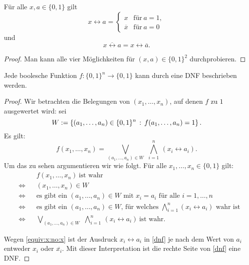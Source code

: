 \begin{lem}
	Für alle $x, a \in \{0,1\}$ gilt
	\begin{equation} \label{equiv:x:no:x}
	x \leftrightarrow a = \begin{cases} 
		x & \text{für} \ a=1,
		\\				\overline{x} & \text{für} \ a=0
	\end{cases} 
	\end{equation}
	und 
	\begin{equation} \label{neg:equiv} 
		\overline{x \leftrightarrow a} = x \leftrightarrow \overline{a}. 
	\end{equation}
\end{lem} 
\begin{proof} 
	Man kann alle vier Möglichkeiten für $(x,a) \in \{0,1\}^2$ durchprobieren. 
\end{proof} 

\begin{thm}
	Jede boolesche Funktion $ f: \{0,1\}^n \to \{0,1\}$ kann durch eine DNF beschrieben werden. 
\end{thm} 
\begin{proof}
	Wir betrachten die Belegungen von $(x_1,\ldots,x_n)$, auf denen $f$ zu $1$ ausgewertet wird: 
	sei 
	\[
	W := \left\{  (a_1,\ldots,a_n) \in \{0,1\}^n \,:\, f(a_1,\ldots,a_n) = 1 \right\}. 
	\]
	Es gilt:
	\begin{equation}
		\label{dnf}
		f(x_1,\ldots,x_n) = \bigvee_{ (a_1,\ldots,a_n) \in W} \ \, \bigwedge_{i=1}^n \, (x_i \leftrightarrow a_i). 
	\end{equation} 
	Um das zu sehen argumentieren wir wie folgt. Für alle $x_1,\ldots,x_n \in \{0,1\}$ gilt:
	\begin{align*}
		& & 	& f(x_1,\ldots,x_n) \ \text{ist wahr}  
	\\	& \Leftrightarrow &  & (x_1,\ldots,x_n) \in W
	\\	& \Leftrightarrow & & \text{es gibt ein $(a_1,\ldots,a_n) \in W$ mit $x_i=a_i$ für alle $i=1,\ldots,n$} 
	\\  & \Leftrightarrow & & \text{es gibt ein $(a_1,\ldots,a_n) \in W$, für welches $\bigwedge_{i=1}^n (x_i \leftrightarrow a_i)$ wahr ist}
	\\  & \Leftrightarrow & & \bigvee_{ (a_1,\ldots,a_n) \in W} \ \, \bigwedge_{i=1}^n \, (x_i \leftrightarrow a_i) \ \text{ist wahr}. 
	\end{align*} 

	Wegen \eqref{equiv:x:no:x} ist der Ausdruck $x_i \leftrightarrow a_i$ in \eqref{dnf} je nach dem Wert von $a_i$ entweder $x_i$ oder $\overline{x_i}$. Mit dieser Interpretation ist die rechte Seite von \eqref{dnf} eine DNF.
\end{proof} 

